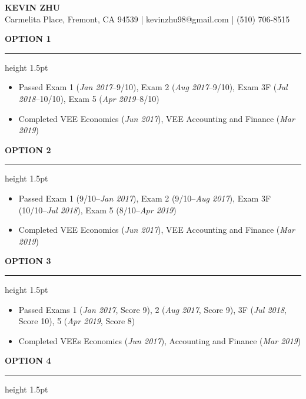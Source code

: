 \documentclass[11pt,letterpaper]{article}
\newcommand{\sectline}{\vspace{4pt}\hrule height 1.5pt\vspace{4pt}}
\newcommand{\sectspace}{\vspace{10pt}}
\begin{document}
\centering
{\fontsize{13pt}{13pt}\selectfont \textbf{KEVIN ZHU}} \vspace{2pt} \\
{\fontsize{11pt}{13pt} Carmelita Place, Fremont, CA 94539 | kevinzhu98@gmail.com | (510) 706-8515}
\sectspace

\fontsize{11pt}{13pt}\selectfont
\raggedright


\textbf{OPTION 1}\sectline
\begin{itemize}
	\item Passed Exam 1 (\textit{Jan 2017}--9/10), Exam 2 (\textit{Aug 2017}--9/10), Exam 3F (\textit{Jul 2018}--10/10), Exam 5 (\textit{Apr 2019}--8/10)
	\item Completed VEE Economics (\textit{Jun 2017}), VEE Accounting and Finance (\textit{Mar 2019})	
\end{itemize}
\sectspace

\textbf{OPTION 2}\sectline
\begin{itemize}
	\item Passed Exam 1 (9/10--\textit{Jan 2017}), Exam 2 (9/10--\textit{Aug 2017}), Exam 3F (10/10--\textit{Jul 2018}), Exam 5 (8/10--\textit{Apr 2019})
	\item Completed VEE Economics (\textit{Jun 2017}), VEE Accounting and Finance (\textit{Mar 2019})	
\end{itemize}
\sectspace

\textbf{OPTION 3}\sectline
\begin{itemize}
	\item Passed Exams 1 (\textit{Jan 2017}, Score 9), 2 (\textit{Aug 2017}, Score 9), 3F (\textit{Jul 2018}, Score 10), 5 (\textit{Apr 2019}, Score 8)
	\item Completed VEEs Economics (\textit{Jun 2017}), Accounting and Finance (\textit{Mar 2019})	
\end{itemize}
\sectspace

\textbf{OPTION 4}\sectline
\begin{itemize}

\end{itemize}
\sectspace
\end{document}

